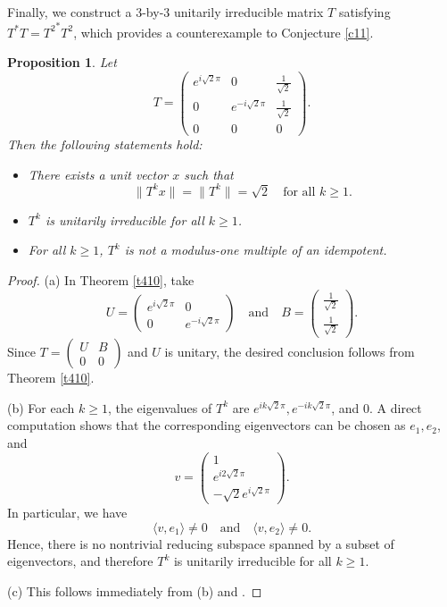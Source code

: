 \documentclass[11pt]{article}
\newtheorem{proposition}[theorem]{Proposition}
\numberwithin{equation}{section}
\begin{document}
Finally, we construct a $3$-by-$3$ unitarily irreducible matrix $T$ satisfying
$T^*T = {T^2}^*T^2$, which provides a counterexample to Conjecture \ref{c11}.

\begin{proposition}\label{prop413}
Let
\[
T =
\begin{pmatrix}
e^{i\sqrt{2}\pi} & 0 & \frac{1}{\sqrt{2}}\\
0 & e^{-i\sqrt{2}\pi} & \frac{1}{\sqrt{2}}\\
0 & 0 & 0
\end{pmatrix}.
\]
Then the following statements hold:
\begin{itemize}
\item[\rm (a)] There exists a unit vector $x$ such that
\[
\|T^k x\| = \|T^k\| = \sqrt{2} \quad \text{for all } k \ge 1.
\]

\item[\rm (b)] $T^k$ is unitarily irreducible for all $k \ge 1$.

\item[\rm (c)] For all $k \ge 1$, $T^k$ is not a modulus-one multiple of an idempotent.
\end{itemize}
\end{proposition}

\begin{proof}
(a) In Theorem \ref{t410}, take
\[
U = \begin{pmatrix}
e^{i\sqrt{2}\pi} & 0 \\
0 & e^{-i\sqrt{2}\pi}
\end{pmatrix}
\quad \mbox{and} \quad
B = \begin{pmatrix} \frac{1}{\sqrt{2}} \\[4pt] \frac{1}{\sqrt{2}} \end{pmatrix}.
\]
Since $T= \begin{pmatrix}
U & B \\
0 & 0
\end{pmatrix}$ and $U$ is unitary, the desired conclusion follows from Theorem \ref{t410}.

\medskip

(b) For each $k \ge 1$, the eigenvalues of $T^k$ are
$
e^{ik\sqrt{2}\pi},  e^{-ik\sqrt{2}\pi}$, and $0$.
A direct computation shows that the corresponding eigenvectors can be chosen as
$
e_1,e_2$, and
\[
v = \begin{pmatrix} 1 \\ e^{i2\sqrt{2}\pi} \\ -\sqrt{2}e^{i\sqrt{2}\pi} \end{pmatrix}.
\]
In particular, we have
\[
\langle v, e_1 \rangle \neq 0 \quad \text{and} \quad \langle v, e_2 \rangle \neq 0.
\]
Hence, there is no nontrivial reducing subspace spanned by a subset of eigenvectors, and therefore $T^k$ is unitarily irreducible for all $k \ge 1$.

\medskip

(c) This follows immediately from (b) and \cite[Lemma 3.1]{GWW}.
\end{proof}
\end{document}
